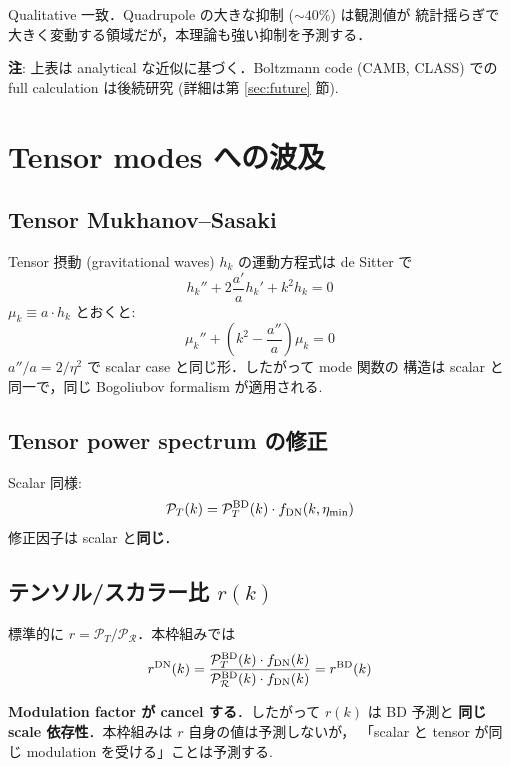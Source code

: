 \documentclass[11pt,a4paper]{article}
\begin{document}
Qualitative 一致．Quadrupole の大きな抑制 ($\sim 40\%$) は観測値が
統計揺らぎで大きく変動する領域だが，本理論も強い抑制を予測する．

\textbf{注}: 上表は analytical な近似に基づく．Boltzmann code (CAMB,
CLASS) での full calculation は後続研究 (詳細は第 \ref{sec:future} 節).

\section{Tensor modes への波及}

\subsection{Tensor Mukhanov--Sasaki}

Tensor 摂動 (gravitational waves) $h_k$ の運動方程式は de Sitter で
\begin{equation}
h_k'' + 2\frac{a'}{a}h_k' + k^2 h_k = 0
\end{equation}
$\mu_k \equiv a\cdot h_k$ とおくと:
\begin{equation}
\mu_k'' + \left(k^2 - \frac{a''}{a}\right)\mu_k = 0
\end{equation}
$a''/a = 2/\eta^2$ で scalar case と同じ形．したがって mode 関数の
構造は scalar と同一で，同じ Bogoliubov formalism が適用される.

\subsection{Tensor power spectrum の修正}

Scalar 同様:
\begin{equation}
\mathcal{P}_T(k) = \mathcal{P}_T^{\rm BD}(k)\cdot f_{\rm DN}(k,\eta_{\rm min})
\end{equation}
修正因子は scalar と\textbf{同じ}．

\subsection{テンソル/スカラー比 $r(k)$}

標準的に $r = \mathcal{P}_T/\mathcal{P}_\mathcal{R}$．本枠組みでは
\begin{equation}
r^{\rm DN}(k) = \frac{\mathcal{P}_T^{\rm BD}(k)\cdot f_{\rm DN}(k)}{\mathcal{P}_\mathcal{R}^{\rm BD}(k)\cdot f_{\rm DN}(k)}
= r^{\rm BD}(k)
\end{equation}

\textbf{Modulation factor が cancel する}．したがって $r(k)$ は BD 予測と
\textbf{同じ scale 依存性}．本枠組みは $r$ 自身の値は予測しないが，
「scalar と tensor が同じ modulation を受ける」ことは予測する.
\end{document}
